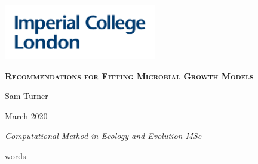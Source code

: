 \documentclass[11pt, a4paper]{article}
\newcommand\wordcount{}
\begin{document}
    \begin{titlepage}
	\centering
	\includegraphics[width=0.5\textwidth]{../data/imperial.png}\par\vspace{1cm}
	\vspace{2cm}
	{\scshape\Large\bfseries Recommendations for Fitting Microbial Growth Models\par}
	\vspace{2cm}
	{\Large Sam Turner\par}
	\vspace{0.5cm}
	{\Large March 2020 \par}
	\vspace{0.5cm}
	{\Large\itshape Computational Method in Ecology and Evolution MSc\par}
	\vspace{0.5cm}
	 \wordcount words 
	\vfill

	\vfill
    
    \newpage
    \end{titlepage}
    
\end{document}
